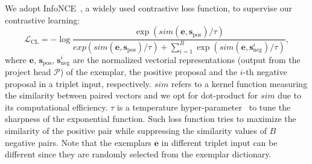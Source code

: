 \documentclass[journal]{IEEEtran}
\newcommand{\peicomment}[1]{\textcolor[rgb]{1,0,0} {#1}}
\begin{document}
We adopt InfoNCE~\cite{oord2018representation}, a widely used contrastive loss function, to supervise our contrastive learning:
\begin{equation}
\mathcal{L}_{\text{CL}} = -\log \frac{\exp(sim(\mathbf{e},\mathbf{s}_{\text{pos}})/\tau)}{exp(sim(\mathbf{e},\mathbf{s}_{\text{pos}})/\tau) + \sum_{i=1}^{B}\exp(sim(\mathbf{e},\mathbf{s}_{\text{neg}}^{i})/\tau) },
    \label{eqn:cl_loss}
\end{equation}
where $\mathbf{e}$, $\mathbf{s}_{\text{pos}}$, $\mathbf{s}^i_{\text{neg}}$ are the normalized vectorial representations (output from the project head $\mathcal{P}$) of the exemplar, the positive proposal and the $i$-th negative proposal in a triplet input, respectively. 
$sim$ refers to a kernel function measuring the similarity between paired vectors and we opt for dot-product for $sim$ due to its computational efficiency. $\tau$ is a temperature hyper-parameter~\cite{wu2018unsupervised} to tune the sharpness of the exponential function.
Such loss function tries to maximize the similarity of the positive pair while suppressing the similarity values of $B$ negative pairs. Note that the exemplars $\mathbf{e}$ in different triplet input can be different since they are randomly selected from the exemplar dictionary.



\begin{comment}
\smallskip\noindent\textbf{Multi-scale contrastive learning mechanism.} We use the obtained exemplar dictionary to construct the training pairs for contrastive learning in a scale-adapted manner, including both positive pairs and negative pairs. Specifically, a positive training pair is constructed by a positive region proposal containing a pedestrian and an exemplar with the consistent scale of bounding box as the proposal, while a negative pair is constructed by a negative region proposal (with pure background) and an same-scale exemplar.
Such scale-adapted way of construction training data can potentially avoid the learning error resulted from the scale inconsistency between a proposal-exemplar pair.


 We perform depth-adapted feature extraction for contrastive learning to adapt to different size (scale) of pedestrian bounding boxes. As shown in Figure~\ref{Fig:Framework}, we extract input features for contrastive learning from shallow-depth layers of the feature learning head $\mathcal{F}_h$ for small size of proposals and exemplars, while extracting input features from deep-depth layers of $\mathcal{F}_h$ for large size of proposals and exemplars.
For instance, the representation $\mathbf{s}$ for a proposal $I_p$ with small size of bounding box is obtained by:
\begin{equation}
    \mathbf{s} = \mathcal{P} \Big (\mathcal{F}_t (\mathcal{F}_h^{\text{shallow-layer}} (I_p))\Big).
    \vspace{-3pt}
\end{equation}

Such depth-adapted feature extraction, together with the proposed scale-adapted construction of training data, allows performing multi-scale contrastive learning to deal with different size of pedestrian bounding boxes. \peicomment{need to be revised}
\end{comment}
\end{document}
